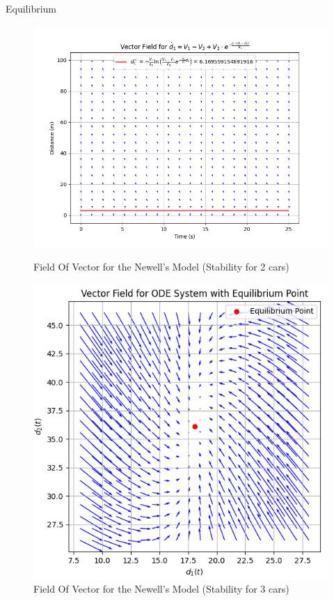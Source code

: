 \documentclass{beamer}
\begin{document}
\begin{frame}{Equilibrium}
	\begin{figure}[H]
		\centering
		\begin{minipage}[t]{0.53\textwidth}
				\centering
				\includegraphics[width=\linewidth]{VectorFIeld.png}
				\caption{Field Of Vector for the Newell's Model (Stability for 2 cars)}
		\end{minipage}
		\hfill 
		\begin{minipage}[t]{0.44\textwidth}
			\centering
			\includegraphics[width=0.9\linewidth]{FieldOfVector_CV2.png}
			\caption{Field Of Vector for the Newell's Model (Stability for 3 cars)}
			\label{fig:FV1}
		\end{minipage}
		\label{fig:CombinedFigures}
	\end{figure}
\end{frame}
\end{document}
